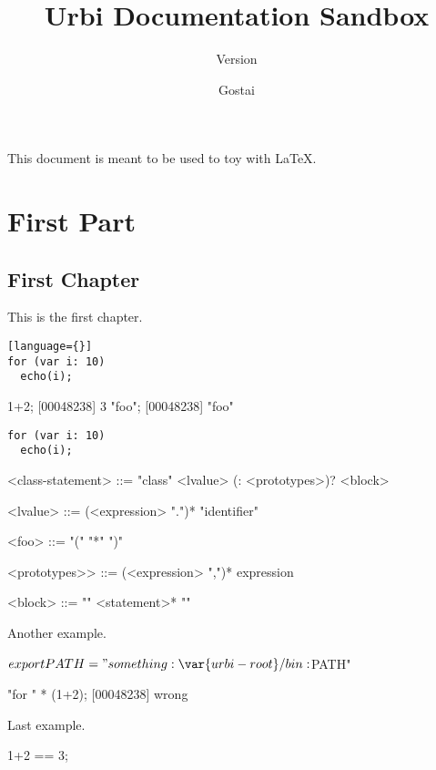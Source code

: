 \documentclass[openright,twoside,11pt]{book}
\title{Urbi Documentation Sandbox}
\subtitle{Version \VcsDescription}
\author{Gostai}
\begin{document}
\maketitle

This document is meant to be used to toy with \LaTeX{}.

\tableofcontents
\part{First Part}

\chapter{First Chapter}

This is the first chapter.

\begin{verbatim}[language={}]
for (var i: 10)
  echo(i);
\end{verbatim}

\begin{urbiscript}
1+2;
[00048238] 3
"foo";
[00048238] "foo"
\end{urbiscript}

\begin{verbatim}
for (var i: 10)
  echo(i);
\end{verbatim}

\begin{bnf}
<class-statement>
  ::= "class" <lvalue> (: <prototypes>)? <block>

<lvalue>
  ::= (<expression> ".")* "identifier"

<foo>
  ::= "(" "*" ")"

<prototypes>>
  ::= (<expression> ",")* expression

<block>
  ::= "{" <statement>* "}"
\end{bnf}

Another example.

\begin{shell}[style=varInString]
$ export PATH="something:\var{urbi-root}/bin:$PATH"
\end{shell}%

\begin{urbiunchecked}[style=varInString]
"for " * (1+2);
[00048238] wrong
\end{urbiunchecked}

Last example.

\begin{urbiassert}
1+2 == 3;
\end{urbiassert}
\end{document}
